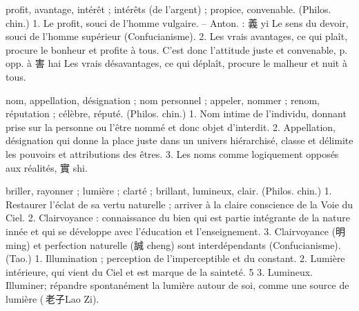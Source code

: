 \begin{Def}[li 利]
  profit, avantage, intérêt ; intérêts (de l’argent) ; propice, convenable. (Philos. chin.) 1. Le profit, souci de l’homme vulgaire. – Anton. : 義 yi Le sens du devoir, souci de l’homme supérieur (Confucianisme). 2. Les vrais avantages, ce qui plaît, procure le bonheur et profite à tous. C’est donc l’attitude juste et convenable, p. opp. à 害 hai Les vrais désavantages, ce qui déplaît, procure le malheur et nuit à tous.   
\end{Def}
\begin{Def}[ming 名 ]
    nom, appellation, désignation ; nom personnel ; appeler, nommer ; renom, réputation ; célèbre, réputé.  (Philos. chin.) 1. Nom intime de l’individu, donnant prise sur la personne ou l’être nommé et donc objet d’interdit. 2. Appellation, désignation qui donne la place juste dans un univers hiérarchisé, classe et délimite les pouvoirs et attributions des êtres. 3. Les noms comme logiquement opposés aux réalités, 實 shi. 
\end{Def}
\begin{Def}[ming 明]
     briller, rayonner ; lumière ; clarté ; brillant, lumineux, clair. (Philos. chin.) 1. Restaurer l’éclat de sa vertu naturelle ; arriver à la claire conscience de la Voie du Ciel. 2. Clairvoyance : connaissance du bien qui est partie intégrante de la nature innée et qui se développe avec l’éducation et l’enseignement. 3. Clairvoyance (明 ming) et perfection naturelle (誠 cheng) sont interdépendants (Confucianisme). (Tao.) 1. Illumination ; perception de l’imperceptible et du constant. 2. Lumière intérieure, qui vient du Ciel et est marque de la sainteté.  5 3. Lumineux. Illuminer; répandre spontanément la lumière autour de soi, comme une source de lumière ( 老子Lao Zi).
\end{Def}
 
